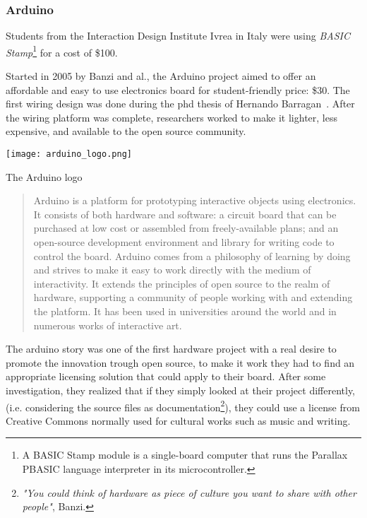 \subsubsection{Arduino} %

Students from the Interaction Design Institute Ivrea in Italy were using \emph{BASIC Stamp}\footnote{A BASIC Stamp module is a single-board computer that runs the Parallax PBASIC language interpreter in its microcontroller.} for a cost of \$100.

\begin{row}{4}{2}
    \begin{cell}{3}
      Started in 2005 by Banzi and al., the Arduino project aimed to offer an affordable and easy to use electronics board for student-friendly price: \$30. The first wiring design was done during the phd thesis of Hernando Barragan~\cite{barragan2004wiring}. After the wiring platform was complete, researchers worked to make it lighter, less expensive, and available to the open source community.
    \end{cell}
    \begin{cell}{1}
        \begin{NFfigure}
            \centering
                \texttt{[image: arduino\_logo.png]}
            \caption{The Arduino logo}
            \label{fig:arduino_logo}
        \end{NFfigure}
    \end{cell}
\end{row}

\begin{quotation}
  Arduino is a platform for prototyping interactive objects using electronics. It consists of both hardware and software: a circuit board that can be purchased at low cost or assembled from freely-available plans; and an open-source development environment and library for writing code to control the board. Arduino comes from a philosophy of learning by doing and strives to make it easy to work directly with the medium of interactivity. It extends the principles of open source to the realm of hardware, supporting a community of people working with and extending the platform. It has been used in universities around the world and in numerous works of interactive art.

\end{quotation}

The arduino story was one of the first hardware project with a real desire to promote the innovation trough open source, to make it work they had to find an appropriate licensing solution that could apply to their board. After some investigation, they realized that if they simply looked at their project differently, (i.e. considering the source files as documentation\footnote{\emph{"You could think of hardware as piece of culture you want to share with other people"}, Banzi. }), they could use a license from Creative Commons normally used for cultural works such as music and writing.


